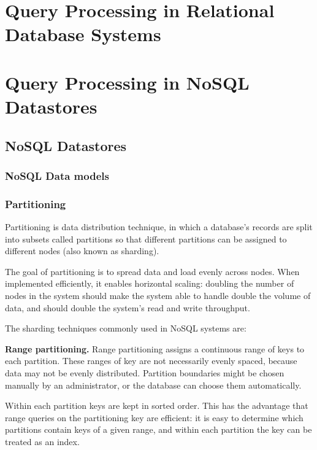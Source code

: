 \section{Query Processing in Relational Database Systems}

\section{Query Processing in NoSQL Datastores}

\subsection{NoSQL Datastores}

\subsubsection{NoSQL Data models}

\subsubsection{Partitioning}
\label{sec:partitioning}

Partitioning is data distribution technique, in which a database's records are split into subsets called partitions so
that different partitions can be assigned to different nodes (also known as sharding).

The goal of partitioning is to spread data and load evenly across nodes.
When implemented efficiently, it enables horizontal scaling:
doubling the number of nodes in the system should make the system able to handle double the volume of data, and
should double the system's read and write throughput.

The sharding techniques commonly used in NoSQL systems are:

\bigskip
\noindent
\textbf{Range partitioning.}
Range partitioning assigns a continuous range of keys to each partition.
These ranges of key are not necessarily evenly spaced, because data may not be evenly distributed.
Partition boundaries might be chosen manually by an administrator, or the database can choose them automatically.

Within each partition keys are kept in sorted order.
This has the advantage that range queries on the partitioning key are efficient:
it is easy to determine which partitions contain keys of a given range, and within each partition the key can be treated
as an index.

